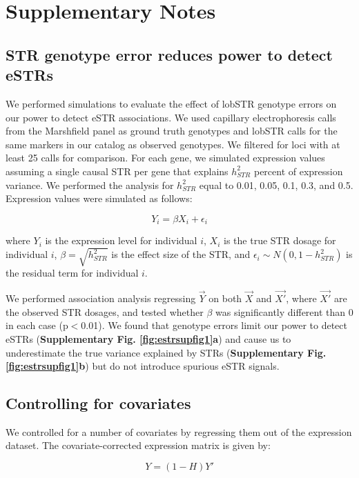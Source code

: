 \section{Supplementary Notes}
\label{sec:estrsupnote}

\subsection{STR genotype error reduces power to detect eSTRs}
We performed simulations to evaluate the effect of lobSTR genotype errors on our power to detect eSTR associations. We used capillary electrophoresis calls from the Marshfield panel as ground truth genotypes and lobSTR calls for the same markers in our catalog as observed genotypes. We filtered for loci with at least 25 calls for comparison. For each gene, we simulated expression values assuming a single causal STR per gene that explains $h^2_{STR}$ percent of expression variance. We performed the analysis for $h^2_{STR}$ equal to 0.01, 0.05, 0.1, 0.3, and 0.5. Expression values were simulated as follows:

\begin{equation}
Y_i = \beta X_i + \epsilon_i
\end{equation}

where $Y_i$ is the expression level for individual $i$, $X_i$ is the true STR dosage for individual $i$, $\beta=\sqrt{h^2_{STR} }$ is the effect size of the STR, and $\epsilon_i \sim N(0, 1-h^2_{STR})$ is the residual term for individual $i$.

We performed association analysis regressing $\vec{Y}$ on both $\vec{X}$ and $\vec{X'}$, where $\vec{X'}$ are the observed STR dosages, and tested whether $\beta$ was significantly different than 0 in each case (p$<$0.01). We found that genotype errors limit our power to detect eSTRs (\textbf{Supplementary Fig. \ref{fig:estrsupfig1}a}) and cause us to underestimate the true variance explained by STRs (\textbf{Supplementary Fig. \ref{fig:estrsupfig1}b}) but do not introduce spurious eSTR signals.

\subsection{Controlling for covariates}
We controlled for a number of covariates by regressing them out of the
expression dataset. The covariate-corrected expression matrix is given
by:

\begin{equation}
Y = (1-H)Y'
\end{equation}

